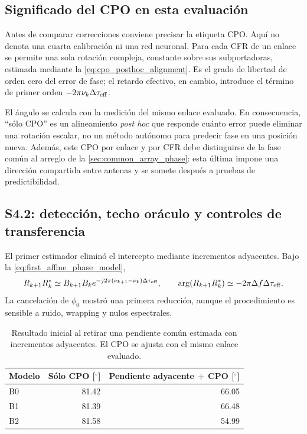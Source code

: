 \subsection{Significado del CPO en esta evaluación}

Antes de comparar correcciones conviene precisar la etiqueta CPO. Aquí no denota
una cuarta calibración ni una red neuronal. Para cada CFR de un enlace se permite
una sola rotación compleja, constante sobre sus subportadoras, estimada mediante la
\cref{eq:cpo_posthoc_alignment}. Es el grado de libertad de orden cero del error de
fase; el retardo efectivo, en cambio, introduce el término de primer orden
$-2\pi\nu_k\Delta\tau_{\rm eff}$.

El ángulo se calcula con la medición del mismo enlace evaluado. En consecuencia,
``sólo CPO'' es un alineamiento \emph{post hoc} que responde cuánto error puede
eliminar una rotación escalar, no un método autónomo para predecir fase en una
posición nueva. Además, este CPO por enlace y por CFR debe distinguirse de la fase
común al arreglo de la \cref{sec:common_array_phase}: esta última impone una
dirección compartida entre antenas y se somete después a pruebas de predictibilidad.

\subsection{S4.2: detección, techo oráculo y controles de transferencia}

El primer estimador eliminó el intercepto mediante incrementos adyacentes. Bajo la
\cref{eq:first_affine_phase_model},
\begin{equation}
R_{k+1}R_k^*\simeq
B_{k+1}B_k e^{-j2\pi(\nu_{k+1}-\nu_k)\Delta\tau_{\rm eff}},
\qquad
\arg(R_{k+1}R_k^*)\simeq-2\pi\Delta f\Delta\tau_{\rm eff}.
\label{eq:adjacent_phase_slope}
\end{equation}
La cancelación de $\phi_0$ mostró una primera reducción, aunque el procedimiento es
sensible a ruido, wrapping y nulos espectrales.

\begin{table}[htbp]
\centering\small
\caption{Resultado inicial al retirar una pendiente común estimada con incrementos
adyacentes. El CPO se ajusta con el mismo enlace evaluado.}
\label{tab:adjacent_slope_results}
\begin{tabular}{lrr}
\toprule
Modelo & Sólo CPO [$^\circ$] & Pendiente adyacente + CPO [$^\circ$]\\
\midrule
B0 & 81.42 & 66.05\\
B1 & 81.39 & 66.48\\
B2 & 81.58 & 54.99\\
\bottomrule
\end{tabular}
\end{table}

